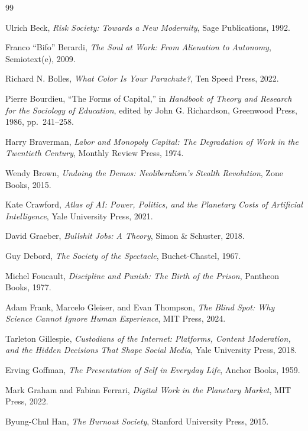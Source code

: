\documentclass[12pt, a4paper]{article}
\theoremstyle{plain}
\theoremstyle{definition}
\theoremstyle{remark}
\begin{document}
\begin{thebibliography}{99}

Ulrich Beck,
\textit{Risk Society: Towards a New Modernity},
Sage Publications,
1992.

Franco ``Bifo'' Berardi,
\textit{The Soul at Work: From Alienation to Autonomy},
Semiotext(e),
2009.

Richard N. Bolles,
\textit{What Color Is Your Parachute?},
Ten Speed Press,
2022.

Pierre Bourdieu,
``The Forms of Capital,''
in \textit{Handbook of Theory and Research for the Sociology of Education},
edited by John G. Richardson,
Greenwood Press,
1986,
pp.~241--258.

Harry Braverman,
\textit{Labor and Monopoly Capital: The Degradation of Work in the Twentieth Century},
Monthly Review Press,
1974.

Wendy Brown,
\textit{Undoing the Demos: Neoliberalism's Stealth Revolution},
Zone Books,
2015.

Kate Crawford,
\textit{Atlas of AI: Power, Politics, and the Planetary Costs of Artificial Intelligence},
Yale University Press,
2021.

David Graeber,
\textit{Bullshit Jobs: A Theory},
Simon \& Schuster,
2018.

Guy Debord,
\textit{The Society of the Spectacle},
Buchet-Chastel,
1967.

Michel Foucault,
\textit{Discipline and Punish: The Birth of the Prison},
Pantheon Books,
1977.

Adam Frank, Marcelo Gleiser, and Evan Thompson,
\textit{The Blind Spot: Why Science Cannot Ignore Human Experience},
MIT Press,
2024.

Tarleton Gillespie,
\textit{Custodians of the Internet: Platforms, Content Moderation, and the Hidden Decisions That Shape Social Media},
Yale University Press,
2018.

Erving Goffman,
\textit{The Presentation of Self in Everyday Life},
Anchor Books,
1959.

Mark Graham and Fabian Ferrari,
\textit{Digital Work in the Planetary Market},
MIT Press,
2022.

Byung-Chul Han,
\textit{The Burnout Society},
Stanford University Press,
2015.


\end{thebibliography}
\end{document}
